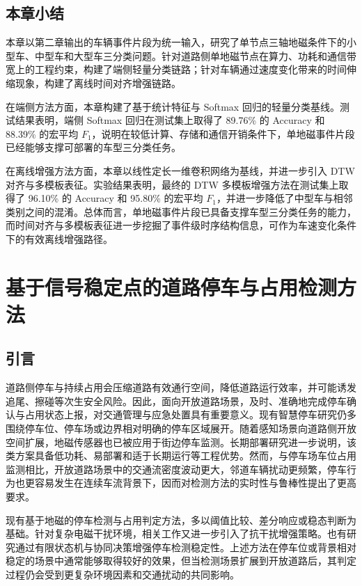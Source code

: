 \documentclass{xdupgthesis}
\begin{document}
\section{本章小结}
\label{sec:ch3_summary}

本章以第二章输出的车辆事件片段为统一输入，研究了单节点三轴地磁条件下的小型车、中型车和大型车三分类问题。针对道路侧单地磁节点在算力、功耗和通信带宽上的工程约束，构建了端侧轻量分类链路；针对车辆通过速度变化带来的时间伸缩现象，构建了离线时间对齐增强链路。

在端侧方法方面，本章构建了基于统计特征与 Softmax 回归的轻量分类基线。测试结果表明，端侧 Softmax 回归在测试集上取得了 89.76\% 的 Accuracy 和 88.39\% 的宏平均 $F_1$，说明在较低计算、存储和通信开销条件下，单地磁事件片段已经能够支撑可部署的车型三分类任务。

在离线增强方法方面，本章以线性定长一维卷积网络为基线，并进一步引入 DTW 对齐与多模板表征。实验结果表明，最终的 DTW 多模板增强方法在测试集上取得了 96.10\% 的 Accuracy 和 95.80\% 的宏平均 $F_1$，并进一步降低了中型车与相邻类别之间的混淆。总体而言，单地磁事件片段已具备支撑车型三分类任务的能力，而时间对齐与多模板表征进一步挖掘了事件级时序结构信息，可作为车速变化条件下的有效离线增强路径。




\chapter{基于信号稳定点的道路停车与占用检测方法}
\label{ch:ch4_parking}

\section{引言}
\label{sec:ch4_intro}

道路侧停车与持续占用会压缩道路有效通行空间，降低道路运行效率，并可能诱发追尾、擦碰等次生安全风险。因此，面向开放道路场景，及时、准确地完成停车确认与占用状态上报，对交通管理与应急处置具有重要意义。现有智慧停车研究仍多围绕停车位、停车场或边界相对明确的停车区域展开\cite{diazogas2020spsurvey}。随着感知场景向道路侧开放空间扩展，地磁传感器也已被应用于街边停车监测\cite{ch4_gu2013streetparking}。长期部署研究进一步说明，该类方案具备低功耗、易部署和适于长期运行等工程优势\cite{ch4_huang2017easydeploy}。然而，与停车场车位占用监测相比，开放道路场景中的交通流密度波动更大，邻道车辆扰动更频繁，停车行为也更容易发生在连续车流背景下，因而对检测方法的实时性与鲁棒性提出了更高要求。

现有基于地磁的停车检测与占用判定方法，多以阈值比较、差分响应或稳态判断为基础\cite{ch4_zhang2015amr}。针对复杂电磁干扰环境，相关工作又进一步引入了抗干扰增强策略\cite{ch4_zhang2020railway}。也有研究通过有限状态机与协同决策增强停车检测稳定性\cite{R47}。上述方法在停车位或背景相对稳定的场景中通常能够取得较好的效果，但当检测场景扩展到开放道路后，其判定过程仍会受到更复杂环境因素和交通扰动的共同影响。
\end{document}
